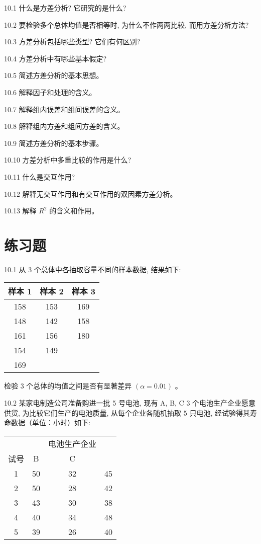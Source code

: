 \documentclass[10pt]{article}
\begin{document}
\begin{CJK*}{UTF8}{bsmi}
10.1 什么是方差分析? 它研究的是什么?

10.2 要检验多个总体均值是否相等时, 为什么不作两两比较, 而用方差分析方法?

10.3 方差分析包括哪些类型? 它们有何区别?

10.4 方差分析中有哪些基本假定?

10.5 简述方差分析的基本思想。

10.6 解释因子和处理的含义。

10.7 解释组内误差和组间误差的含义。

10.8 解释组内方差和组间方差的含义。

10.9 简述方差分析的基本步骤。

10.10 方差分析中多重比较的作用是什么?

10.11 什么是交互作用?

10.12 解释无交互作用和有交互作用的双因素方差分析。

10.13 解释 $R^{2}$ 的含义和作用。

\section*{练习题}
10.1 从 3 个总体中各抽取容量不同的样本数据, 结果如下:

\begin{center}
\begin{tabular}{ccc}
\hline
样本 1 & 样本 2 & 样本 3 \\
\hline
158 & 153 & 169 \\
148 & 142 & 158 \\
161 & 156 & 180 \\
154 & 149 &  \\
169 &  &  \\
\hline
\end{tabular}
\end{center}

检验 3 个总体的均值之间是否有显著差异 $(\alpha=0.01)$ 。

10.2 某家电制造公司准备购进一批 5 号电池, 现有 A, B, C 3 个电池生产企业愿意供货, 为比较它们生产的电池质量, 从每个企业各随机抽取 5 只电池, 经试验得其寿命数据（单位：小时）如下:

\begin{center}
\begin{tabular}{cccc}
\hline
 &  & 电池生产企业 &  \\
\cline { 2 - 4 }
试号 & B & C &  \\
\hline
1 & 50 & 32 & 45 \\
2 & 50 & 28 & 42 \\
3 & 43 & 30 & 38 \\
4 & 40 & 34 & 48 \\
5 & 39 & 26 & 40 \\
\hline
\end{tabular}
\end{center}


\end{CJK*}
\end{document}
